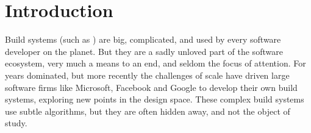 \section{Introduction}\label{sec-intro}

Build systems (such as \Make) are big, complicated, and used by every
software developer on the planet.  But they are a sadly unloved part
of the software ecosystem, very much a means to an end, and seldom the
focus of attention.
For years \Make dominated, but more recently the challenges of scale have driven
large software firms like Microsoft, Facebook and Google to develop their own
build systems, exploring new points in the design space. These complex build
systems use subtle algorithms, but they are often hidden away, and not the
object of study.

